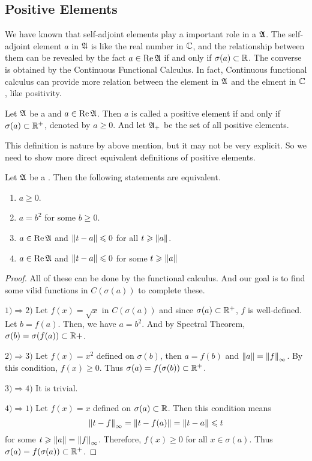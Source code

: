 \documentclass[a4paper,11pt]{report}
\begin{document}
\subsection{Positive Elements}

We have known that self-adjoint elements play a important role in a \Cs $\mathfrak{A}$. The self-adjoint element $a$ in $\mathfrak{A}$ is like the real number in $\mathbb{C}$, and the relationship between them can be revealed by the fact $a \in \operatorname{Re}{\mathfrak{A}}$ if and only if $\sigma(a) \subset \mathbb{R}$. The converse is obtained by the Continuous Functional Calculus. In fact, Continuous functional calculus can provide more relation between the element in $\mathfrak{A}$ and the elment in $\mathbb{C}$, like positivity.

\begin{defn}
	Let $\mathfrak{A}$ be a \Cs and $a \in \operatorname{Re}{\mathfrak{A}}$. Then $a$ is called a positive element if and only if $\sigma(a) \subset \mathbb{R}^{+}$, denoted by $a \geqslant 0$. And let $\mathfrak{A}_{+}$ be the set of all positive elements.
\end{defn}

This definition is nature by above mention, but it may not be very explicit. So we need to show more direct equivalent definitions of positive elements.

\begin{thm}
	Let $\mathfrak{A}$ be a \Cs. Then the following statements are equivalent.
	\begin{enumerate}[label=\arabic*)]
		\item $a \geqslant 0$.
		\item $a = b^2$ for some $b \geqslant 0$.
		\item $a \in \operatorname{Re}{\mathfrak{A}}$ and $\left\lVert t - a\right\lVert \leqslant 0$ for all $t \geqslant \left\lVert a\right\lVert$.
		\item $a \in \operatorname{Re}{\mathfrak{A}}$ and $\left\lVert t - a\right\lVert \leqslant 0$ for some $t \geqslant \left\lVert a\right\lVert$
	\end{enumerate}
\end{thm}
\begin{proof}
	All of these can be done by the functional calculus. And our goal is to find some vilid functions in $C(\sigma(a))$ to complete these.
	\item $1) \Rightarrow 2)$ Let $f(x) = \sqrt{x}$ in $C(\sigma(a))$ and since $\sigma(a) \subset \mathbb{R}^{+}$, $f$ is well-defined. Let $b = f(a)$. Then, we have $a = b^{2}$. And by Spectral Theorem, $\sigma(b) = \sigma(f(a)) \subset \mathbb{R}{+}$.
	\item $2) \Rightarrow 3)$ Let $f(x) = x^2$ defined on $\sigma(b)$, then $a = f(b)$ and $\left\lVert a\right\lVert = \left\lVert f\right\lVert_{\infty}$. By this condition, $f(x) \geqslant 0$. Thus $\sigma(a) = f(\sigma(b)) \subset \mathbb{R}^{+}$.
	\item $3) \Rightarrow 4)$ It is trivial.
	\item $4) \Rightarrow 1)$ Let $f(x) = x$ defined on $\sigma(a) \subset \mathbb{R}$. Then this condition means 
	\begin{equation*}
		\left\lVert t-f\right\lVert_{\infty} = \left\lVert t-f(a)\right\lVert =\left\lVert t-a\right\lVert \leqslant t
	\end{equation*}
	for some $t \geqslant \left\lVert a\right\lVert = \left\lVert f\right\lVert_{\infty}$. Therefore, $f(x) \geqslant 0$ for all $x \in \sigma(a)$. Thus $\sigma(a) = f(\sigma(a)) \subset \mathbb{R}^{+}$.
\end{proof}
\end{document}
